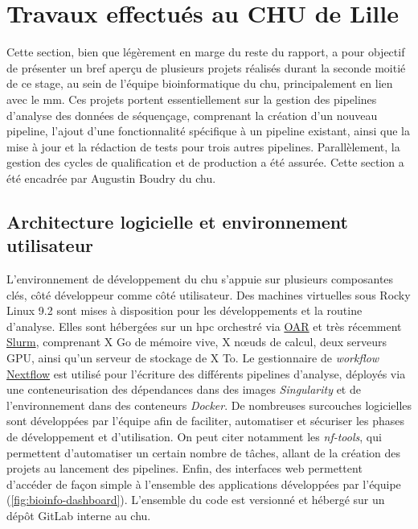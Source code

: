 \chapter{Travaux effectués au CHU de Lille}

Cette section, bien que légèrement en marge du reste du rapport, a pour objectif de présenter un bref aperçu 
de plusieurs projets réalisés durant la seconde moitié de ce stage, au sein de l'équipe bioinformatique du \gls{chu}, 
principalement en lien avec le \gls{mm}. Ces projets portent essentiellement sur la gestion des pipelines d'analyse 
des données de séquençage, comprenant la création d'un nouveau pipeline, l'ajout d'une fonctionnalité spécifique à 
un pipeline existant, ainsi que la mise à jour et la rédaction de tests pour trois autres pipelines. Parallèlement, 
la gestion des cycles de qualification et de production a été assurée. Cette section a été encadrée par Augustin Boudry du \gls{chu}.

\section{Architecture logicielle et environnement utilisateur}

L'environnement de développement du \gls{chu} s'appuie sur plusieurs composantes clés, côté développeur comme côté utilisateur.
Des machines virtuelles sous Rocky Linux 9.2 sont mises à disposition pour les développements et la routine d'analyse.
Elles sont hébergées sur un \gls{hpc} orchestré via \href{https://oar.imag.fr/}{OAR} et très récemment \href{https://slurm.schedmd.com/documentation.html}{Slurm},  
comprenant X Go de mémoire vive, X nœuds de calcul, deux serveurs GPU, ainsi qu'un serveur de stockage de X To.
Le gestionnaire de \textit{workflow} \href{https://www.nextflow.io/}{Nextflow} est utilisé pour l'écriture des différents pipelines d'analyse, 
déployés via une conteneurisation des dépendances dans des images \textit{Singularity} et de l'environnement dans des conteneurs \textit{Docker}.
De nombreuses surcouches logicielles sont développées par l'équipe afin de faciliter, automatiser et sécuriser les phases de développement et d'utilisation.
On peut citer notamment les \textit{nf-tools}, qui permettent d'automatiser un certain nombre de tâches, allant de la création des projets au lancement des pipelines.
Enfin, des interfaces web permettent d'accéder de façon simple à l'ensemble des applications développées par l'équipe (\autoref{fig:bioinfo-dashboard}).
L'ensemble du code est versionné et hébergé sur un dépôt GitLab interne au \gls{chu}.

